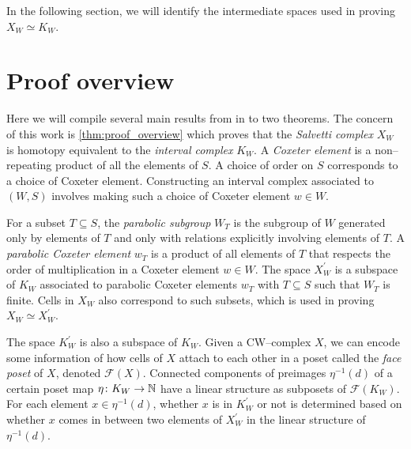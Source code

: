 \documentclass[class=guthesis, crop=false]{standalone}
\begin{document}
In the following section, we will identify the intermediate spaces used in proving $X_W \simeq K_W$.

\section{Proof overview}

Here we will compile several main results from \cite{paolini_salvetti_kpi1_2021} in to two theorems. The concern of this work is \cref{thm:proof_overview} which proves that the \emph{Salvetti complex} $X_W$ is homotopy equivalent to the \emph{interval complex} $K_W$. A \emph{Coxeter element} is a non--repeating product of all the elements of $S$. A choice of order on $S$ corresponds to a choice of Coxeter element. Constructing an interval complex associated to $(W,S)$ involves making such a choice of Coxeter element $w \in W$. 

For a subset $T \subseteq S$, the \emph{parabolic subgroup} $W_T$ is the subgroup of $W$ generated only by elements of $T$ and only with relations explicitly involving elements of $T$. A \emph{parabolic Coxeter element} $w_T$ is a product of all elements of $T$ that respects the order of multiplication in a Coxeter element $w \in W$. The space $X_W^\prime$ is a subspace of $K_W$ associated to parabolic Coxeter elements $w_T$ with $T \subseteq S$ such that $W_T$ is finite. Cells in $X_W$ also correspond to such subsets, which is used in proving $X_W \simeq X_W^\prime$.

The space $K_W^\prime$ is also a subspace of $K_W$. Given a CW--complex $X$, we can encode some information of how cells of $X$ attach to each other in a poset called the \emph{face poset} of $X$, denoted $\mathcal{F}(X)$. Connected components of preimages $\eta^{-1}(d)$ of a certain poset map $\eta \colon K_W \to \mathbb{N}$ have a linear structure as subposets of $\mathcal{F}(K_W)$. For each element $x \in \eta^{-1}(d)$, whether $x$ is in $K_W^\prime$ or not is determined based on whether $x$ comes in between two elements of $X_W^\prime$ in the linear structure of $\eta^{-1}(d)$.
\end{document}
